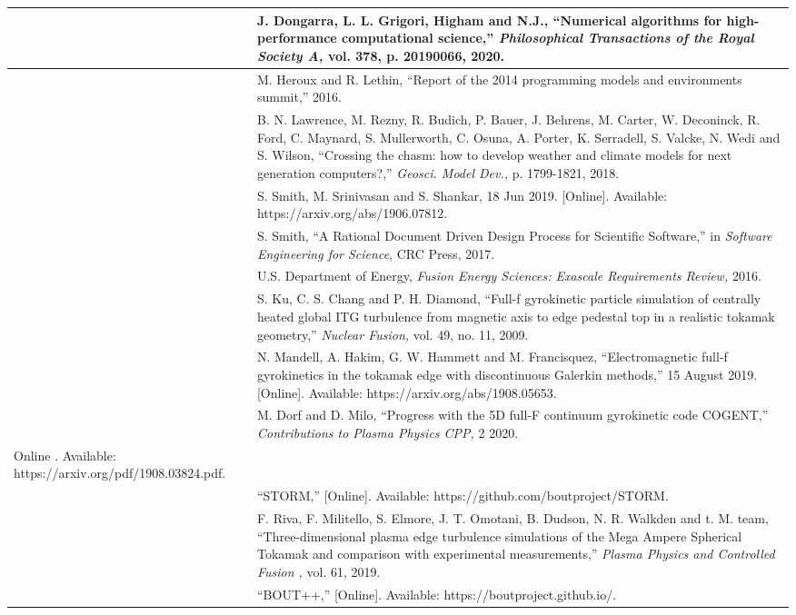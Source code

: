 \documentclass{article}
\begin{document}
\baselineskip=12pt
\begin{tabular}{|>{\raggedright}p{8pt}|>{\raggedright}p{312pt}|}
\hline
[1]  & J. Dongarra, L. L. Grigori, Higham and N.J., ``Numerical algorithms for 
high-performance computational science,'' \textit{Philosophical Transactions of 
the Royal Society A, }vol. 378, p. 20190066, 2020. \tabularnewline
\hline
[2]  & M. Heroux and R. Lethin, ``Report of the 2014 programming models and environments 
summit,'' 2016.\tabularnewline
\hline
[3]  & B. N. Lawrence, M. Rezny, R. Budich, P. Bauer, J. Behrens, M. Carter, W. 
Deconinck, R. Ford, C. Maynard, S. Mullerworth, C. Osuna, A. Porter, K. Serradell, 
S. Valcke, N. Wedi and S. Wilson, ``Crossing the chasm: how to develop weather 
and climate models for next generation computers?,'' \textit{Geosci. Model Dev., 
}p. 1799-1821, 2018. \tabularnewline
\hline
[4]  & S. Smith, M. Srinivasan and S. Shankar, 18 Jun 2019. [Online]. Available: 
https://arxiv.org/abs/1906.07812.\tabularnewline
\hline
[5]  & S. Smith, ``A Rational Document Driven Design Process for Scientific Software,'' 
in \textit{Software Engineering for Science}, CRC Press, 2017. \tabularnewline
\hline
[6]  & U.S. Department of Energy, \textit{Fusion Energy Sciences: Exascale Requirements 
Review, }2016. \tabularnewline
\hline
[7]  & S. Ku, C. S. Chang and P. H. Diamond, ``Full-f gyrokinetic particle simulation 
of centrally heated global ITG turbulence from magnetic axis to edge pedestal top 
in a realistic tokamak geometry,'' \textit{Nuclear Fusion, }vol. 49, no. 11, 2009. 
\tabularnewline
\hline
[8]  & N. Mandell, A. Hakim, G. W. Hammett and M. Francisquez, ``Electromagnetic 
full-f gyrokinetics in the tokamak edge with discontinuous Galerkin methods,'' 
15 August 2019. [Online]. Available: https://arxiv.org/abs/1908.05653.\tabularnewline
\hline
[9]  & M. Dorf and D. Milo, ``Progress with the 5D full-F continuum gyrokinetic 
code COGENT,'' \textit{Contributions to Plasma Physics CPP, }2 2020. \tabularnewline
\hline
\item [Online]. Available: https://arxiv.org/pdf/1908.03824.pdf.\tabularnewline
\hline
[11]  & ``STORM,'' [Online]. Available: https://github.com/boutproject/STORM.\tabularnewline
\hline
[12]  & F. Riva, F. Militello, S. Elmore, J. T. Omotani, B. Dudson, N. R. Walkden 
and t. M. team, ``Three-dimensional plasma edge turbulence simulations of the Mega 
Ampere Spherical Tokamak and comparison with experimental measurements,'' \textit{Plasma 
Physics and Controlled Fusion , }vol. 61, 2019. \tabularnewline
\hline
[13]  & ``BOUT++,'' [Online]. Available: https://boutproject.github.io/.\tabularnewline

\end{tabular}
\end{document}
